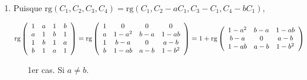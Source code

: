 {{\begin{enumerate}
\begin{itemize}
\item[3ème cas.] Si $a=b=c$, il est clair dès le départ que $A$ est de rang $1$.
\end{itemize}

\item  Puisque $\mbox{rg}(C_1,C_2,C_3,C_4)=\mbox{rg}(C_1,C_2-aC_1,C_3-C_1,C_4-bC_1)$,

\begin{align*}\ensuremath
\mbox{rg}\left(
\begin{array}{cccc}
1&a&1&b\\
a&1&b&1\\
1&b&1&a\\
b&1&a&1
\end{array}
\right)&=\mbox{rg}\left(
\begin{array}{cccc}
1&0&0&0\\
a&1-a^2&b-a&1-ab\\
1&b-a&0&a-b\\
b&1-ab&a-b&1-b^2
\end{array}
\right)=1+\mbox{rg}\left(
\begin{array}{ccc}
1-a^2&b-a&1-ab\\
b-a&0&a-b\\
1-ab&a-b&1-b^2
\end{array}
\right)
\end{align*}

\begin{itemize}
\item[1er cas.] Si $a\neq b$.


\end{itemize}
\end{enumerate}}}
